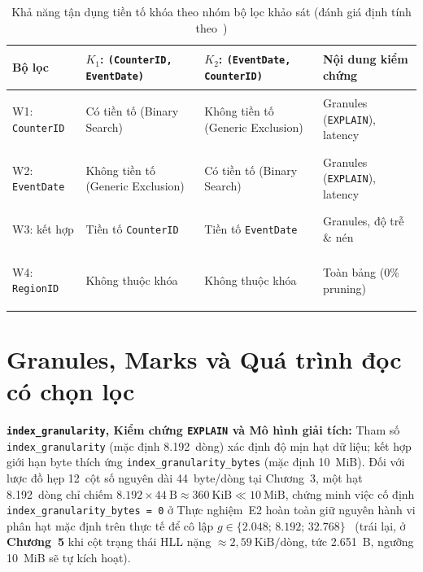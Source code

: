 \documentclass[13pt,a4paper]{report}
\begin{document}
\begin{table}[!htb]
\centering
\footnotesize
\renewcommand{\arraystretch}{1.14}
\caption{Khả năng tận dụng tiền tố khóa theo nhóm bộ lọc khảo sát (đánh giá định tính theo~\cite{S4, S4a})}
\label{tab:prefix_utilization}
\begin{tabularx}{\textwidth}{>{\bfseries\raggedright\arraybackslash}p{2.9cm} >{\raggedright\arraybackslash}X >{\raggedright\arraybackslash}X >{\raggedright\arraybackslash}p{3.6cm}}
\toprule
\textbf{Bộ lọc} & \textbf{$K_1$:} \texttt{(\allowbreak{}CounterID, EventDate)} & \textbf{$K_2$:} \texttt{(\allowbreak{}EventDate, CounterID)} & \textbf{Nội dung kiểm chứng} \\
\midrule
W1: \texttt{CounterID} & Có tiền tố (Binary Search) & Không tiền tố (Generic Exclusion) & Granules (\texttt{EXPLAIN}), latency \\
\addlinespace[3pt]
W2: \texttt{EventDate} & Không tiền tố (Generic Exclusion) & Có tiền tố (Binary Search) & Granules (\texttt{EXPLAIN}), latency \\
\addlinespace[3pt]
W3: kết hợp & Tiền tố \texttt{CounterID} & Tiền tố \texttt{EventDate} & Granules, độ trễ \& nén \\
\addlinespace[3pt]
W4: \texttt{RegionID} & Không thuộc khóa & Không thuộc khóa & Toàn bảng (0\% pruning) \\
\bottomrule
\end{tabularx}
\end{table}

\section{Granules, Marks và Quá trình đọc có chọn lọc}
\noindent\textbf{\texttt{index\_\allowbreak{}granularity}, Kiểm chứng \texttt{EXPLAIN} và Mô hình giải tích:}
Tham số \texttt{index\_\allowbreak{}granularity} (mặc định 8.192~dòng) xác định độ mịn hạt dữ liệu; kết hợp giới hạn byte thích ứng \texttt{index\_\allowbreak{}granularity\_\allowbreak{}bytes} (mặc định 10~MiB). Đối với lược đồ hẹp 12~cột số nguyên dài 44~byte/dòng tại Chương~3, một hạt 8.192~dòng chỉ chiếm $8.192 \times 44~\text{B} \approx 360~\text{KiB} \ll 10~\text{MiB}$, chứng minh việc cố định \texttt{index\_\allowbreak{}granularity\_\allowbreak{}bytes = 0} ở Thực nghiệm~E2 hoàn toàn giữ nguyên hành vi phân hạt mặc định trên thực tế để cô lập $g \in \{2.048;\, 8.192;\, 32.768\}$~\cite{S2} (trái lại, ở \textbf{Chương~5} khi cột trạng thái HLL nặng $\approx 2{,}59~\text{KiB/dòng}$, tức 2.651~B, ngưỡng 10~MiB sẽ tự kích hoạt).
\end{document}
